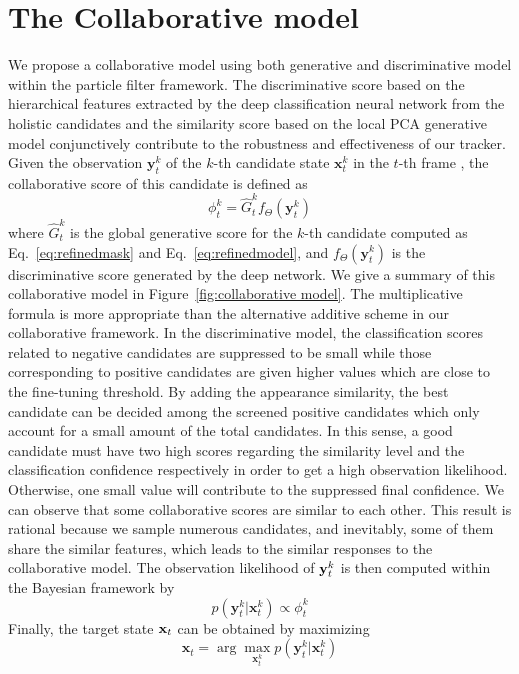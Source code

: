 \documentclass[preprint,12pt,review]{elsarticle}
\begin{document}
\section{The Collaborative model}
We propose a collaborative model using both generative and discriminative model within the particle filter framework.
The discriminative score based on the hierarchical features extracted by the deep classification neural network from the holistic candidates and the similarity score based on the local PCA generative model conjunctively contribute to the robustness and effectiveness of our tracker.
Given the observation $\mathbf{y}_t^k$ of the $k$-th candidate state $\mathbf{x}_t^k$ in the $t$-th frame , the collaborative score of this candidate is defined as
\begin{equation}  \label{eq:collaborative model}
{\phi_t^k} = {\hat{G}_t^k}{f_{\Theta}(\mathbf{y}_t^k)}
\end{equation}
where $\hat{G}_t^k$ is the global generative score for the $k$-th candidate computed as Eq.~\ref{eq:refinedmask} and Eq.~\ref{eq:refinedmodel}, and $f_{\Theta}(\mathbf{y}_t^k)$ is the discriminative score generated by the deep network.
We give a summary of this collaborative model in Figure~\ref{fig:collaborative model}.
The multiplicative formula is more appropriate than the alternative additive scheme in our collaborative framework.
In the discriminative model, the classification scores related to negative candidates are suppressed to be small while those corresponding to positive candidates are given higher values which are close to the fine-tuning threshold.
By adding the appearance similarity, the best candidate can be decided among the screened positive candidates which only account for a small amount of the total candidates.
In this sense, a good candidate must have two high scores regarding the similarity level and the classification confidence respectively in order to get a high observation likelihood.
Otherwise, one small value will contribute to the suppressed final confidence.
We can observe that some collaborative scores are similar to each other.
This result is rational because we sample numerous candidates, and inevitably, some of them share the similar features, which leads to the similar responses to the collaborative model.
The observation likelihood of ${{\bf{y}}_t^k}$ is then computed within the Bayesian framework by
\begin{equation}
p({\mathbf{y}_t^k}|{\mathbf{x}_t^k}) \propto {\phi_t^k}
\end{equation}
Finally, the target state ${{\bf{x}}_t}$ can be obtained by maximizing
\begin{equation}{{\mathbf{x}}_t} = \arg \max_{\mathbf{x}_t^k} p({\mathbf{y}_t^k}|{\mathbf{x}_t^k})
\end{equation}
\end{document}
